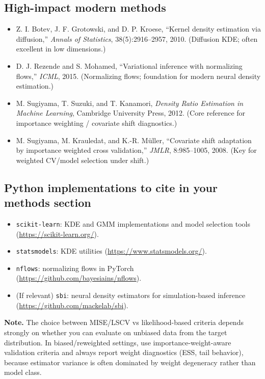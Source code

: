 \documentclass[twocolumn]{notes}
\begin{document}
\subsection*{High-impact modern methods}
\begin{itemize}[leftmargin=2em]
\item Z. I. Botev, J. F. Grotowski, and D. P. Kroese, ``Kernel density estimation via diffusion,'' \emph{Annals of Statistics}, 38(5):2916--2957, 2010. (Diffusion KDE; often excellent in low dimensions.)
\item D. J. Rezende and S. Mohamed, ``Variational inference with normalizing flows,'' \emph{ICML}, 2015. (Normalizing flows; foundation for modern neural density estimation.)
\item M. Sugiyama, T. Suzuki, and T. Kanamori, \emph{Density Ratio Estimation in Machine Learning}, Cambridge University Press, 2012. (Core reference for importance weighting / covariate shift diagnostics.)
\item M. Sugiyama, M. Krauledat, and K.-R. M\"uller, ``Covariate shift adaptation by importance weighted cross validation,'' \emph{JMLR}, 8:985--1005, 2008. (Key for weighted CV/model selection under shift.)
\end{itemize}

\subsection*{Python implementations to cite in your methods section}
\begin{itemize}[leftmargin=2em]
\item \texttt{scikit-learn}: KDE and GMM implementations and model selection tools (\url{https://scikit-learn.org/}).
\item \texttt{statsmodels}: KDE utilities (\url{https://www.statsmodels.org/}).
\item \texttt{nflows}: normalizing flows in PyTorch (\url{https://github.com/bayesiains/nflows}).
\item (If relevant) \texttt{sbi}: neural density estimators for simulation-based inference (\url{https://github.com/mackelab/sbi}).
\end{itemize}

\bigskip
\noindent\textbf{Note.} The choice between MISE/LSCV vs likelihood-based criteria depends strongly on whether you can evaluate on unbiased data from the target distribution. In biased/reweighted settings, use importance-weight-aware validation criteria and always report weight diagnostics (ESS, tail behavior), because estimator variance is often dominated by weight degeneracy rather than model class.
\end{document}
